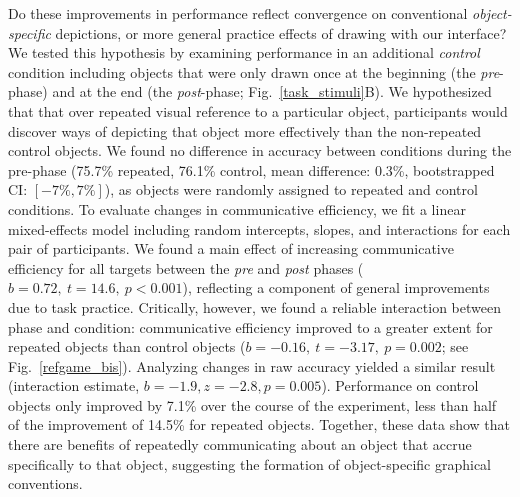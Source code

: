 \documentclass[11pt,letterpaper]{article}
\begin{document}
Do these improvements in performance reflect convergence on conventional \emph{object-specific} depictions, or more general practice effects of drawing with our interface?
We tested this hypothesis by examining performance in an additional \emph{control} condition including objects that were only drawn once at the beginning (the \emph{pre}-phase) and at the end (the \emph{post}-phase;  Fig.~\ref{task_stimuli}B).
We hypothesized that that over repeated visual reference to a particular object, participants would discover ways of depicting that object more effectively than the non-repeated control objects.
We found no difference in accuracy between conditions during the pre-phase (75.7\% repeated, 76.1\% control, mean difference: 0.3\%, bootstrapped CI: $[-7\%, 7\%]$), as objects were randomly assigned to repeated and control conditions.
To evaluate changes in communicative efficiency, we fit a linear mixed-effects model including random intercepts, slopes, and interactions for each pair of participants.
We found a main effect of increasing communicative efficiency for all targets between the \textit{pre} and \textit{post} phases ($b = 0.72,~t = 14.6,~p <0.001$), reflecting a component of general improvements due to task practice.
Critically, however, we found a reliable interaction between phase and condition: communicative efficiency improved to a greater extent for repeated objects than control objects ($b = -0.16, ~t = -3.17,~p = 0.002$; see Fig.~\ref{refgame_bis}).
Analyzing changes in raw accuracy yielded a similar result (interaction estimate, $b=-1.9,z=-2.8,p=0.005$).
Performance on control objects only improved by 7.1\% over the course of the experiment, less than half of the improvement of 14.5\% for repeated objects.
Together, these data show that there are benefits of repeatedly communicating about an object that accrue specifically to that object, suggesting the formation of object-specific graphical conventions.
\end{document}
